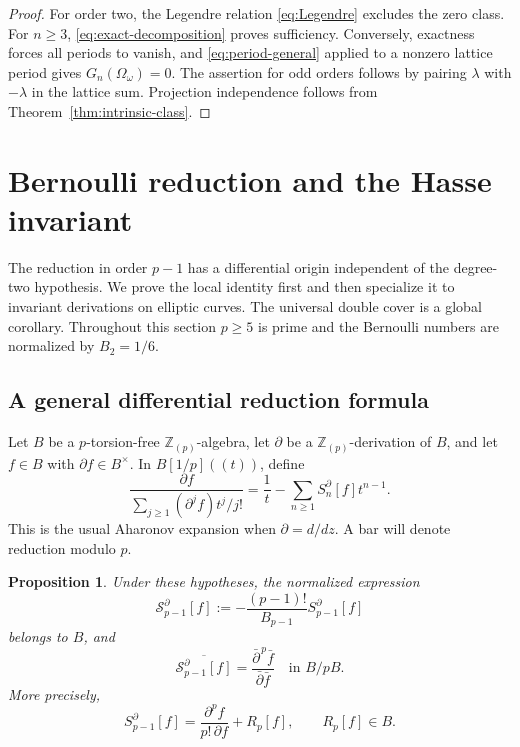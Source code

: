 \documentclass[11pt]{amsart}
\newtheorem{prop}[thm]{Proposition}
\theoremstyle{definition}
\theoremstyle{remark}
\numberwithin{equation}{section}
\begin{document}
\begin{proof}
For order two, the Legendre relation \eqref{eq:Legendre} excludes the
zero class. For $n\geq3$, \eqref{eq:exact-decomposition} proves
sufficiency. Conversely, exactness forces all periods to vanish,
and \eqref{eq:period-general} applied to a nonzero lattice period
gives $G_n(\Omega_\omega)=0$. The assertion for odd orders follows by
pairing $\lambda$ with $-\lambda$ in the lattice sum. Projection
independence follows from Theorem~\ref{thm:intrinsic-class}.
\end{proof}

\section{Bernoulli reduction and the Hasse invariant}
\label{sec:hasse-reduction}

The reduction in order $p-1$ has a differential origin independent of
the degree-two hypothesis. We prove the local identity first and then
specialize it to invariant derivations on elliptic curves. The
universal double cover is a global corollary. Throughout this section
$p\geq5$ is prime and the Bernoulli numbers are normalized by $B_2=1/6$.

\subsection{A general differential reduction formula}

Let $B$ be a $p$-torsion-free $\mathbb Z_{(p)}$-algebra, let $\partial$
be a $\mathbb Z_{(p)}$-derivation of $B$, and let $f\in B$ with
$\partial f\in B^\times$. In $B[1/p]((t))$, define
\begin{equation}\label{eq:differential-Aharonov}
\frac{\partial f}{\displaystyle\sum_{j\geq1}
 (\partial^j f)t^j/j!}
=\frac1t-\sum_{n\geq1}S_n^\partial[f]t^{n-1}.
\end{equation}
This is the usual Aharonov expansion when $\partial=d/dz$. A bar
will denote reduction modulo $p$.

\begin{prop}\label{prop:Bernoulli-reduction}
Under these hypotheses, the normalized expression
\[
\mathcal S_{p-1}^\partial[f]
:=-\frac{(p-1)!}{B_{p-1}}S_{p-1}^\partial[f]
\]
belongs to $B$, and
\begin{equation}\label{eq:universal-Bernoulli-reduction}
\overline{\mathcal S_{p-1}^\partial[f]}
=\frac{\bar\partial^{\,p}\bar f}{\bar\partial\bar f}
\quad\text{in } B/pB.
\end{equation}
More precisely,
\begin{equation}\label{eq:leading-p-derivative}
S_{p-1}^\partial[f]
=\frac{\partial^p f}{p!\,\partial f}+R_p[f],
\qquad R_p[f]\in B.
\end{equation}
\end{prop}
\end{document}
